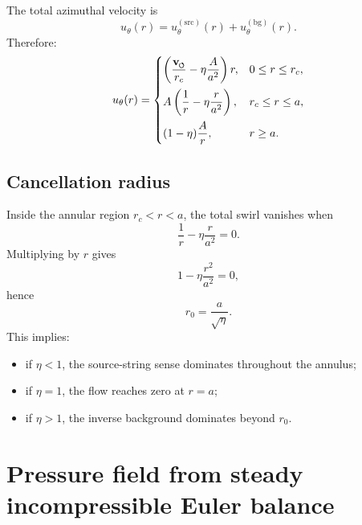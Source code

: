 \documentclass[11pt]{article}
\newcommand{\swirlarrow}{\mathchoice{\mkern-2mu\scriptstyle\boldsymbol{\circlearrowleft}}{\mkern-2mu\scriptstyle\boldsymbol{\circlearrowleft}}{\mkern-2mu\scriptscriptstyle\boldsymbol{\circlearrowleft}}{\mkern-2mu\scriptscriptstyle\boldsymbol{\circlearrowleft}}}
\newcommand{\vswirl}{\mathbf{v}_{\swirlarrow}}
\newcommand{\rc}{r_c}
\newcommand{\src}{\mathrm{src}}
\newcommand{\bg}{\mathrm{bg}}
\begin{document}
            The total azimuthal velocity is
            \begin{equation}
                u_\theta(r)=u_\theta^{(\src)}(r)+u_\theta^{(\bg)}(r).
                \label{eq:u-total}
            \end{equation}
            Therefore:
            \begin{equation}
                u_\theta(r)=
                \begin{cases}
                    \displaystyle \left(\frac{\vswirl}{\rc}-\eta \frac{A}{a^2}\right)r,
                    & 0\le r\le \rc, \\[1em]
                    \displaystyle A\left(\frac{1}{r}-\eta \frac{r}{a^2}\right),
                    & \rc \le r \le a, \\[1em]
                    \displaystyle (1-\eta)\frac{A}{r},
                    & r\ge a.
                \end{cases}
                \label{eq:u-total-piecewise}
            \end{equation}
        
        \subsection{Cancellation radius}
            
            Inside the annular region \(\rc<r<a\), the total swirl vanishes when
            \[
                \frac{1}{r}-\eta \frac{r}{a^2}=0.
            \]
            Multiplying by \(r\) gives
            \[
                1-\eta \frac{r^2}{a^2}=0,
            \]
            hence
            \begin{equation}
                \boxed{
                    r_0=\frac{a}{\sqrt{\eta}}.
                }
                \label{eq:r0}
            \end{equation}
            This implies:
            \begin{itemize}
                \item if \(\eta<1\), the source-string sense dominates throughout the annulus;
                \item if \(\eta=1\), the flow reaches zero at \(r=a\);
                \item if \(\eta>1\), the inverse background dominates beyond \(r_0\).
            \end{itemize}
        
        \section{Pressure field from steady incompressible Euler balance}
        
\end{document}

